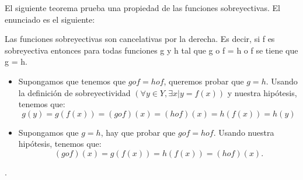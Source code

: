 %
\begin{isabellebody}%
%
%
\isadelimtheory
%
\endisadelimtheory
%
\isatagtheory
%
\endisatagtheory
{\isafoldtheory}%
%
\isadelimtheory
%
\endisadelimtheory
%
\isadelimdocument
%
\endisadelimdocument
%
\isatagdocument
%
\isamarkuptrue%
%
\endisatagdocument
{\isafolddocument}%
%
\isadelimdocument
%
\endisadelimdocument
%
\begin{isamarkuptext}%
El siguiente teorema prueba una propiedad de las funciones
 sobreyectivas. El enunciado es el siguiente: 
\begin {teorema}
Las funciones sobreyectivas son cancelativas por la derecha. Es decir,
 si f es sobreyectiva entonces para todas funciones g y h tal que g o f
 = h o f se tiene que g = h.
\end {teorema}
 
\begin {demostracion}
\begin {itemize}
\item Supongamos que tenemos que $g o f = h o f$, queremos probar que $g =
 h.$ Usando la definición de sobreyectividad $(\forall y \in Y,
 \exists x | y = f(x))$ y nuestra hipótesis, tenemos que:
$$g(y) = g(f(x)) = (g o f) (x) = (h o f) (x) = h(f(x)) = h(y)$$
\item Supongamos que $g = h$, hay que probar que $g o f = h o f.$ Usando
nuestra hipótesis, tenemos que:
$$ (g o f)(x) = g(f(x)) = h(f(x)) = (h o f) (x).$$
\end {itemize}
.
\end {demostracion}


\end{isamarkuptext}
\end{isabellebody}
